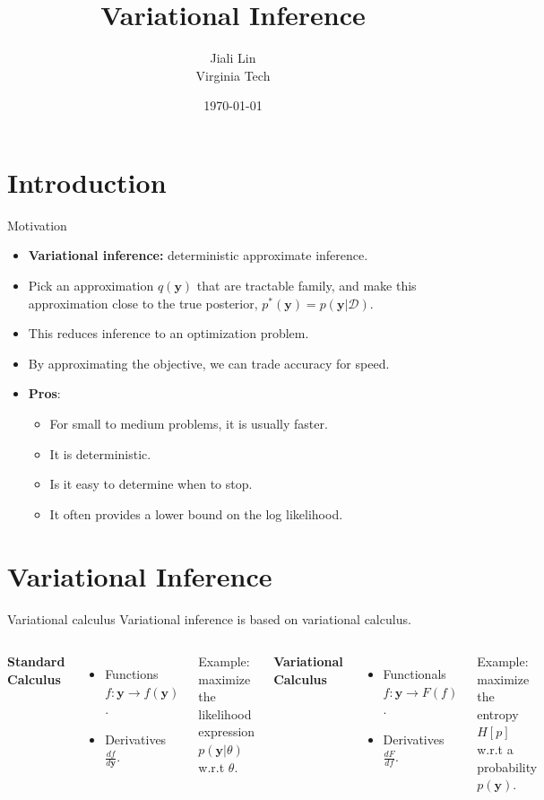 \documentclass[10pt,mathserif]{beamer}
\title{\large \bfseries Variational Inference}
\author{Jiali Lin\\[3ex]
Virginia Tech}
\date{\today}
\begin{document}
\frame{
\thispagestyle{empty}
\titlepage
}

\section{Introduction}
\begin{frame}{Motivation}
\begin{itemize}
    \item \textbf{Variational inference:} deterministic approximate inference. 
    \item Pick an approximation $q(\bm{y})$ that are tractable family, and make this approximation close  to the true posterior, $p^*(\bm{y}) = p(\bm{y}|\mathcal{D})$.
    \item This reduces inference to an optimization problem.
    \item By approximating the objective, we can trade accuracy for speed.
    \item \textbf{Pros}:
    \begin{itemize}
        \item For small to medium problems, it is usually faster.
        \item It is deterministic.
        \item Is it easy to determine when to stop.
        \item It often provides a lower bound on the log likelihood.
    \end{itemize}
\end{itemize}    
\end{frame}

\section{Variational Inference}
\begin{frame}{Variational calculus}
Variational inference is based on variational calculus.
\bigskip
\begin{columns}
\textbf{Standard Calculus} 
\begin{itemize}
    \item Functions $f:\bm{y}\rightarrow f(\bm{y})$.
    \item Derivatives $\frac{df}{d\bm{y}}$.
\end{itemize}
Example: maximize the likelihood expression $p(\bm{y}|\theta)$ w.r.t $\theta$.

\textbf{Variational Calculus} 
\begin{itemize}
    \item Functionals $f:\bm{y}\rightarrow F(f)$.
    \item Derivatives $\frac{dF}{df}$.
\end{itemize}
Example: maximize the entropy $H[p]$ w.r.t a probability $p(\bm{y})$.
\end{columns}
\end{frame}
\end{document}
